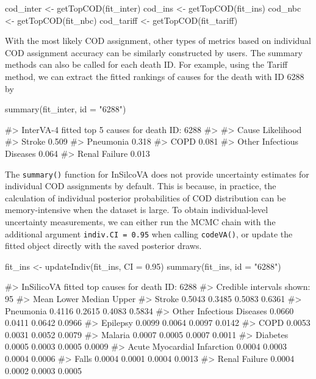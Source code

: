 \begin{Schunk}
\begin{Sinput}
cod_inter <- getTopCOD(fit_inter)
cod_ins <- getTopCOD(fit_ins)
cod_nbc <- getTopCOD(fit_nbc)
cod_tariff <- getTopCOD(fit_tariff)
\end{Sinput}
\end{Schunk}

With the most likely COD assignment, other types of metrics based on
individual COD assignment accuracy can be similarly constructed by
users. The summary methods can also be called for each death ID. For
example, using the Tariff method, we can extract the fitted rankings of
causes for the death with ID 6288 by

\begin{Schunk}
\begin{Sinput}
summary(fit_inter, id = "6288")
\end{Sinput}
\begin{Soutput}
#> InterVA-4 fitted top 5 causes for death ID: 6288
#> 
#>  Cause                     Likelihood
#>  Stroke                    0.509     
#>  Pneumonia                 0.318     
#>  COPD                      0.081     
#>  Other Infectious Diseases 0.064     
#>  Renal Failure             0.013
\end{Soutput}
\end{Schunk}

The \texttt{summary()} function for InSilcoVA does not provide
uncertainty estimates for individual COD assignments by default. This is
because, in practice, the calculation of individual posterior
probabilities of COD distribution can be memory-intensive when the
dataset is large. To obtain individual-level uncertainty measurements,
we can either run the MCMC chain with the additional argument
\texttt{indiv.CI\ =\ 0.95} when calling \texttt{codeVA()}, or update the
fitted object directly with the saved posterior draws.

\begin{Schunk}
\begin{Sinput}
fit_ins <- updateIndiv(fit_ins, CI = 0.95)
summary(fit_ins, id = "6288")
\end{Sinput}
\begin{Soutput}
#> InSilicoVA fitted top  causes for death ID: 6288
#> Credible intervals shown: 95%
#>                               Mean  Lower Median  Upper
#> Stroke                      0.5043 0.3485 0.5083 0.6361
#> Pneumonia                   0.4116 0.2615 0.4083 0.5834
#> Other Infectious Diseases   0.0660 0.0411 0.0642 0.0966
#> Epilepsy                    0.0099 0.0064 0.0097 0.0142
#> COPD                        0.0053 0.0031 0.0052 0.0079
#> Malaria                     0.0007 0.0005 0.0007 0.0011
#> Diabetes                    0.0005 0.0003 0.0005 0.0009
#> Acute Myocardial Infarction 0.0004 0.0003 0.0004 0.0006
#> Falls                       0.0004 0.0001 0.0004 0.0013
#> Renal Failure               0.0004 0.0002 0.0003 0.0005
\end{Soutput}
\end{Schunk}

